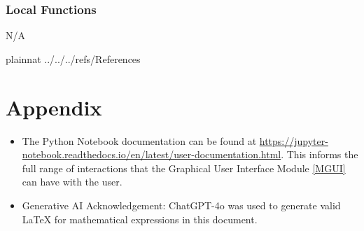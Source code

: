 \documentclass[12pt, titlepage]{article}
\begin{document}
\subsubsection{Local Functions}

N/A

\newpage

 {plainnat}
 {../../../refs/References}

\newpage

\section{Appendix} \label{Appendix}

\begin{itemize}
  \item The Python Notebook documentation can be found at
  \url{https://jupyter-notebook.readthedocs.io/en/latest/user-documentation.html}.
  This informs the full range of interactions that the Graphical User Interface
  Module \ref{MGUI} can have with the user.
  \item Generative AI Acknowledgement: ChatGPT-4o was used to generate valid
  LaTeX for mathematical expressions in this document.
\end{itemize}

\newpage{}
\end{document}
